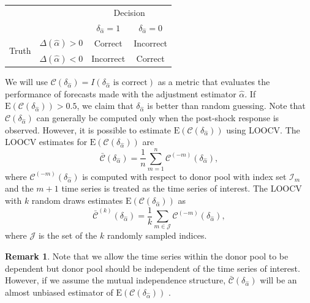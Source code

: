 \documentclass[11pt,3p,review,authoryear]{elsarticle}
\def\mc#1{\mathcal{#1}} %
\def\E#1{\mathrm{E}(#1)} %
\theoremstyle{definition}
\newtheorem{remark}{Remark}
\begin{document}
\begin{center}
  \begin{center}
      \begin{tabular}{cc|c|c}
        \hline
        & & \multicolumn{2}{c}{Decision} \\
        & & $\delta_{\hat{\alpha}} = 1$ & $\delta_{\hat{\alpha}} = 0$ \\ 
                \hline
     \multirow{2}{*}{Truth}  & $\Delta(\hat{\alpha})>0$ & Correct & Incorrect \\
      \cline{3-4}
      & $\Delta(\hat{\alpha})<0$  & Incorrect & Correct \\
      \hline
      \end{tabular}
  \end{center}
\end{center} 
\vspace*{0.3cm}


We will use 
$
	\mc{C}(\delta_{\hat\alpha}) 
	= I(\delta_{\hat{\alpha}} \text{ is correct})
$
as a metric that evaluates the performance of forecasts made with the adjustment estimator $\hat\alpha$. If $\E{\mc{C}(\delta_{\hat{\alpha}})} > 0.5$, we claim that $\delta_{\hat{\alpha}}$ is better than random guessing. Note that $\mc{C}(\delta_{\hat{\alpha}})$ can generally be computed only when the post-shock response is observed. However, it is possible to estimate $\E{\mc{C}(\delta_{\hat{\alpha}})}$ using LOOCV. 
The LOOCV estimates for $\E{\mc{C}(\delta_{\hat{\alpha}})}$ are
\begin{equation} \label{loocvm}
	 \bar{\mc{C}}(\delta_{\hat{\alpha}})= \frac{1}{n} \sum_{m = 1}^n \mc{C}^{(-m)}(\delta_{\hat{\alpha}}),
	\end{equation}
where $\mc{C}^{(-m)}(\delta_{\hat{\alpha}})$ is computed with respect to donor pool with index set $\mc{I}_m$ and the $m+1$ time series is treated as the time series of interest.  The LOOCV with $k$ random draws estimates $\E{\mc{C}(\delta_{\hat{\alpha}})}$ as
\begin{equation} \label{loocvk}
	 \bar{\mc{C}}^{(k)}(\delta_{\hat{\alpha}})= \frac{1}{k} \sum_{m \in \mc{J}} \mc{C} ^{(-m)}(\delta_{\hat{\alpha}})	,
\end{equation}
where $\mc{J}$ is the set of the $k$ randomly sampled indices. 

\begin{remark}
  Note that we allow the time series within the donor pool to be dependent but donor pool should be independent of the time series of interest. However, if we assume the mutual  independence structure, $\bar{\mc{C}}(\delta_{\hat{\alpha}})$ will be an almost unbiased estimator of $\E{\mc{C}(\delta_{\hat{\alpha}})}$ \citep[Page 222]{msos}. 
\end{remark}
\end{document}
